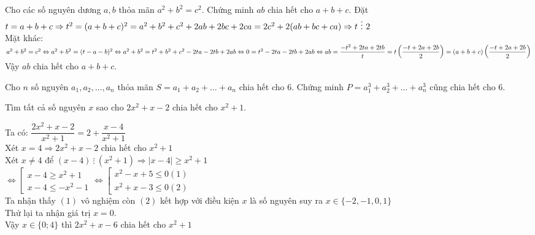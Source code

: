 \begin{ex}

	Cho các số nguyên dương $a,b$ thỏa mãn $a^2+b^2=c^2$. Chứng minh $ab$ chia hết cho $a+b+c$.
	\loigiai
	{
		 Đặt $t=a+b+c \\ \Rightarrow t^2=(a+b+c)^2=a^2+b^2+c^2+2ab+2bc+2ca=2c^2+2(ab+bc+ca) \Rightarrow t \  \vdots \ 2$\\
			Mặt khác: $a^2+b^2=c^2 \Leftrightarrow a^2+b^2=(t-a-b)^2\\
			\Leftrightarrow a^2+b^2=t^2+b^2+c^2-2ta-2tb+2ab\\ \Leftrightarrow 0=t^2-2ta-2tb+2ab\\ \Leftrightarrow ab=\dfrac{-t^2+2ta+2tb}{t}=t\left(\dfrac{-t+2a+2b}{2}\right)=(a+b+c)\left(\dfrac{-t+2a+2b}{2}\right)$\\
			Vậy $ab$ chia hết cho $a+b+c$.
	}
\end{ex}
\begin{ex}
	Cho $n$ số nguyên $a_1,a_2,\ldots,a_n$ thỏa mãn $S=a_1+a_2+\ldots+a_n$ chia hết cho $6$. Chứng minh $P=a_1^3+a_2^3+\ldots+a_n^3$ cũng chia hết cho $6$.
\end{ex}
\begin{ex}
Tìm tất cả số nguyên $x$ sao cho $2x^2 + x - 2$ chia hết cho $x^2 + 1$.
		
	\loigiai
	{
		
		 Ta có: $\dfrac{{2{x^2} + x - 2}}{{{x^2} + 1}} = 2 + \dfrac{{x - 4}}{{{x^2} + 1}}$\\
			Xét $x=4\Rightarrow 2x^2+x-2$ chia hết cho $x^2+1$\\
			Xét $x\neq 4$ để $(x-4)\  \vdots \ (x^2+1)\Rightarrow |x-4|\geq x^2+1$\\
			$ \Leftrightarrow \left[ {\begin{array}{*{20}{c}}
				{x - 4 \ge {x^2} + 1}\\
				{x - 4 \le  - {x^2} - 1}
				\end{array}} \right. \Leftrightarrow \left[ {\begin{array}{*{20}{c}}
				{{x^2} - x + 5 \le 0\left( 1 \right)}\\
				{{x^2} + x - 3 \le 0\left( 2 \right)}
				\end{array}} \right.$\\
			Ta nhận thấy $(1)$ vô nghiệm còn $(2)$ kết hợp với điều kiện $x$ là số nguyên suy ra $x\in \{-2,-1,0,1\}$\\
			Thử lại ta nhận giá trị $x=0$.\\
			Vậy $x\in \{0;4\}$ thì $2x^2+x-6$ chia hết cho $x^2+1$
	}
\end{ex}
